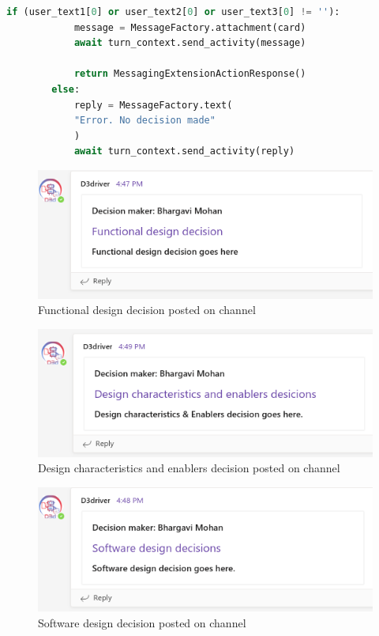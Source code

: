 \begin{lstlisting}[caption={Submit button handling},label={lst:submit},language=python]
        if (user_text1[0] or user_text2[0] or user_text3[0] != ''):
            message = MessageFactory.attachment(card)
            await turn_context.send_activity(message)
    
            return MessagingExtensionActionResponse()
        else:  
            reply = MessageFactory.text(
            "Error. No decision made"
            )
            await turn_context.send_activity(reply) 
\end{lstlisting}

\begin{figure}[h]
\centering
\includegraphics[width=0.7\linewidth]{figures/fdd}
\captionsetup{justification=centering}
\caption{Functional design decision posted on channel}
\label{fig:fdd}
\end{figure}

\begin{figure}[h]
\centering
\includegraphics[width=0.7\linewidth]{figures/dce}
\captionsetup{justification=centering}
\caption{Design characteristics and enablers decision posted on channel}
\label{fig:dce}
\end{figure}

\begin{figure}[h]
\centering
\includegraphics[width=0.7\linewidth]{figures/sw}
\captionsetup{justification=centering}
\caption{Software design decision posted on channel}
\label{fig:sw}
\end{figure}





